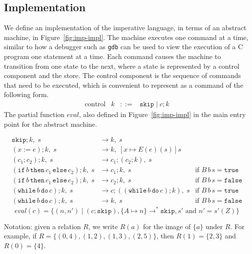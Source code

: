 \documentclass{tufte-handout}
\newcommand{\ASSIGN}[2]{#1 \mathrel{:=} #2}
\newcommand{\SEQ}[2]{#1 \mathrel{;} #2}
\newcommand{\SKIP}[0]{\mathtt{skip}}
\newcommand{\IF}[3]{\mathtt{if}\,#1\,\mathtt{then}\,#2\,\mathtt{else}\,#3}
\newcommand{\WHILE}[2]{\mathtt{while}\,#1\,\mathtt{do}\,#2}
\newcommand{\TRUE}[0]{\mathtt{true}}
\newcommand{\FALSE}[0]{\mathtt{false}}
\begin{document}
\subsection{Implementation}

We define an implementation of the imperative language, in terms of an
abstract machine, in Figure~\ref{fig:imp-impl}. The machine executes
one command at a time, similar to how a debugger such as \texttt{gdb}
can be used to view the execution of a C program one statement at a
time. Each command causes the machine to transition from one state to
the next, where a state is represented by a control component and the
store. The control component is the sequence of commands that need to
be executed, which is convenient to represent as a command of the
following form.
\[
\begin{array}{lrcl}
  \text{control} & k & ::= & \SKIP \mid \SEQ{c}{k}
\end{array}
\]
The partial function $\mathit{eval}$, also defined in
Figure~\ref{fig:imp-impl} in the main entry point for the abstract
machine.


\begin{figure*}[tbp]

\hfill {}
\begin{align*}
  \SEQ{\SKIP}{k},\; s & \longrightarrow k,\; s \\
  \SEQ{(\ASSIGN{x}{e})}{k},\; s & \longrightarrow k,\; [x\mapsto E(e)(s)]s\\
  \SEQ{(\SEQ{c_1}{c_2})}{k},\; s & \longrightarrow
      \SEQ{c_1}{(\SEQ{c_2}{k})},\; s \\
  \SEQ{(\IF{b}{c_1}{c_2})}{k},\; s & \longrightarrow \SEQ{c_1}{k},\; s
     & \text{if } B\,b\,s = \TRUE \\
  \SEQ{(\IF{b}{c_1}{c_2})}{k},\; s & \longrightarrow \SEQ{c_2}{k},\; s
     & \text{if } B\,b\,s = \FALSE \\
  \SEQ{(\WHILE{b}{c})}{k},\; s & \longrightarrow
      \SEQ{c}{(\SEQ{(\WHILE{b}{c})}{k})},\; s
    & \text{if } B\,b\,s = \TRUE \\
  \SEQ{(\WHILE{b}{c})}{k},\; s & \longrightarrow k,\; s
    & \text{if } B\,b\,s = \FALSE 
\end{align*}
\[
  \mathit{eval}(c) = \{ (n,n') \mid
     (\SEQ{c}{\SKIP}), \{A\mapsto n\}
     \longrightarrow^{*} \SKIP, s'
     \text{ and } n' = s'(Z) \}
\]
\caption{Abstract Machine for IMP}
\label{fig:imp-impl}
\end{figure*}

Notation: given a relation $R$, we write $R(a)$ for the image of
$\{a\}$ under $R$. For example, if $R=\{ (0,4), (1,2), (1,3), (2,5)
\}$, then $R(1) = \{2,3\}$ and $R(0) = \{4\}$.
\end{document}
